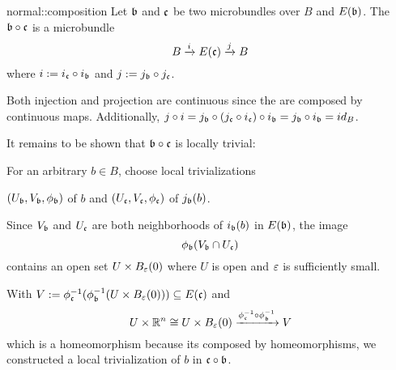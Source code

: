 \begin{mydefinition}{normal::composition}
    Let $\bb$ and $\bc$ be two microbundles over $B$ and $E(\bb)$.
    The  $\bb \circ \bc$ is a microbundle
    \[ \bundle{B}{E(\bc)}{i}{j} \]
    where $i := i_\bc \circ i_\bb$ and $j := j_\bb \circ j_\bc$.
\end{mydefinition}

\begin{myproof}
    Both injection and projection are continuous since the are composed by continuous maps.
    Additionally, $j \circ i = j_\bb \circ (j_\bc \circ i_\bc) \circ i_\bb = j_\bb \circ i_\bb = id_B$.

    It remains to be shown that $\bb \circ \bc$ is locally trivial:

    For an arbitrary $b \in B$, choose local trivializations
    \begin{center}
        $(U_\bb, V_\bb, \phi_\bb)$ of $b$ and $(U_\bc, V_\bc, \phi_\bc)$ of $j_\bb(b)$.
    \end{center}
    Since $V_\bb$ and $U_\bc$ are both neighborhoods of $i_\bb(b)$ in $E(\bb)$, the image
    \[ \phi_\bb(V_\bb \cap U_\bc) \]
    contains an open set $U \times \ball[\eps]$ where $U$ is open and $\eps$ is sufficiently small.

    With $V := \inv{\phi_\bc}(\inv{\phi_\bb}(U \times \ball[\eps])) \sub E(\bc)$ and
    \[ U \times \R^n \cong U \times \ball[\eps] \xto{\inv{\phi_\bc} \circ \inv{\phi_\bb}} V \]
    which is a homeomorphism because its composed by homeomorphisms,
    we constructed a local trivialization of $b$ in $\bc \circ \bb$.
\end{myproof}